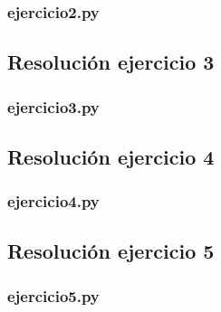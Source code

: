 \documentclass[11pt,a4paper]{article}
\begin{document}
		\subsubsection{ejercicio2.py}
			

	\newpage

	\subsection{Resolución ejercicio 3}\label{ejercicio_3}
		\subsubsection{ejercicio3.py}
			

	\newpage

	\subsection{Resolución ejercicio 4}\label{ejercicio_4}
		\subsubsection{ejercicio4.py}
			

	\newpage

	\subsection{Resolución ejercicio 5}\label{ejercicio_5}
		\subsubsection{ejercicio5.py}
			
\end{document}
